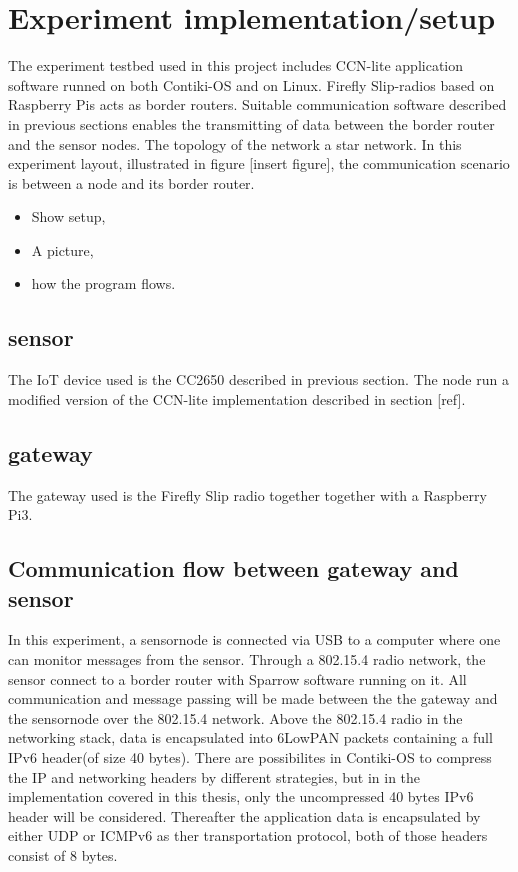 \section{Experiment implementation/setup}
The experiment testbed used in this project includes CCN-lite application software runned on both Contiki-OS and on Linux. Firefly Slip-radios based on Raspberry Pis acts as border routers. Suitable communication software described in previous sections enables the transmitting of data between the border router and the sensor nodes. The topology of the network a star network. In this experiment layout, illustrated in figure [insert figure], the communication scenario is between a node and its border router.


\begin{itemize}
	\item Show setup,
	\item A picture,
	\item how the program flows.

\end{itemize}
\subsection{sensor}
The IoT device used is the CC2650 described in previous section. The node run a modified version of the CCN-lite implementation described in section [ref].

\subsection{gateway}
The gateway used is the Firefly Slip radio together together with a Raspberry Pi3. 


\subsection{Communication flow between gateway and sensor}
In this experiment, a sensornode is connected via USB to a computer where one can monitor messages from the sensor. Through a 802.15.4 radio network, the sensor connect to a border router with Sparrow software running on it. All communication and message passing will be made between the the gateway and the sensornode over the 802.15.4 network. Above the 802.15.4 radio in the networking stack, data is encapsulated into 6LowPAN packets containing a full IPv6 header(of size 40 bytes). There are possibilites in Contiki-OS to compress the IP and networking headers by different strategies, but in in the implementation covered in this thesis, only the uncompressed 40 bytes IPv6 header will be considered. Thereafter the application data is encapsulated by either UDP or ICMPv6 as ther transportation protocol, both of those headers consist of 8 bytes. 
\\\\

